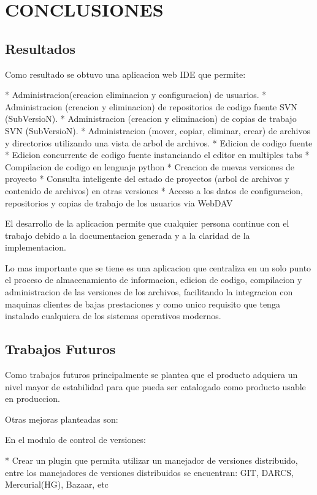 \section{CONCLUSIONES}

\subsection{Resultados}

Como resultado se obtuvo una aplicacion web IDE que permite:

* Administracion(creacion eliminacion y configuracion) de usuarios.
* Administracion (creacion y eliminacion) de repositorios de codigo fuente SVN (SubVersioN).
* Administracion (creacion y eliminacion) de copias de trabajo SVN (SubVersioN).
* Administracion (mover, copiar, eliminar, crear) de archivos y directorios utilizando una vista de arbol de archivos.
* Edicion de codigo fuente
* Edicion concurrente de codigo fuente instanciando el editor en multiples tabs
* Compilacion de codigo en lenguaje python
* Creacion de nuevas versiones de proyecto
* Consulta inteligente del estado de proyectos (arbol de archivos y contenido de archivos) en otras versiones
* Acceso a los datos de configuracion, repositorios y copias de trabajo de los usuarios via WebDAV

El desarrollo de la aplicacion permite que cualquier persona continue con el trabajo debido a la documentacion generada y a la claridad de la implementacion.

Lo mas importante que se tiene es una aplicacion que centraliza en un solo punto el proceso de almacenamiento de informacion, edicion de codigo, compilacion y administracion de las versiones de los archivos, facilitando la integracion con maquinas clientes de bajas prestaciones y como unico requisito que tenga instalado cualquiera de los sistemas operativos modernos.

\subsection{Trabajos Futuros}

Como trabajos futuros principalmente se plantea que el producto adquiera un nivel mayor de estabilidad para que pueda ser catalogado como producto usable en produccion.

Otras mejoras planteadas son:

En el modulo de control de versiones:

* Crear un plugin que permita utilizar un manejador de versiones distribuido, entre los manejadores de versiones distribuidos se encuentran: GIT, DARCS, Mercurial(HG), Bazaar, etc

